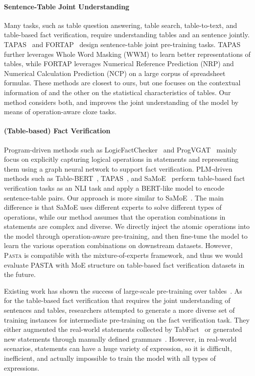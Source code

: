 \documentclass[11pt]{article}
\newcommand{\pasta}{\textsc{Pasta}\xspace}
\newcommand{\stitle}[1]{\vspace{1mm}\noindent{\bf #1}}
\newcommand{\term}[1]{\xspace}
\begin{document}
\paragraph{Sentence-Table Joint Understanding}

Many 
tasks, such as table question answering, table search, table-to-text, and table-based fact verification, require understanding tables and an \term{NL} sentence jointly.
TAPAS~\cite{tapas} and FORTAP~\cite{fortap} design sentence-table joint pre-training tasks. TAPAS further leverages Whole Word Masking (WWM) to learn better representations of tables, while FORTAP leverages Numerical Reference Prediction (NRP) and Numerical Calculation Prediction (NCP) on a large corpus of spreadsheet formulas.
These methods are closest to ours, but one focuses on the contextual information of \term{NL} and the other on the statistical characteristics of tables. Our method considers both, and improves the joint understanding of the model by means of operation-aware cloze tasks.

\paragraph{(Table-based) Fact Verification}

Program-driven methods such as LogicFactChecker~\cite{logicfactchecker} and ProgVGAT~\cite{progvgat} mainly focus on explicitly capturing logical operations in statements and representing them using a graph neural network to support fact verification. PLM-driven methods such as Table-BERT~\cite{tabfact}, TAPAS~\cite{tapasfv}, and SaMoE~\cite{SaMoE} perform table-based fact verification tasks as an NLI task and apply a BERT-like model to encode sentence-table pairs. Our approach is more similar to SaMoE~\cite{SaMoE}. 
The main difference is that SaMoE uses different experts to solve different types of operations, while our method assumes that the operation combinations in statements are complex and diverse. We directly inject the atomic operations into the model through operation-aware pre-training, and then fine-tune the model to learn the various operation combinations on downstream datasets. However, \pasta is compatible with the mixture-of-experts framework, and thus we would evaluate PASTA with MoE structure on table-based fact verification datasets in the future.


\iffalse
\stitle{Remarks.}
Existing work has shown the success of large-scale pre-training over tables~\cite{tapas,turl,tabert}. As for the table-based fact verification that requires the joint understanding of \term{NL} sentences and tables, researchers attempted to generate a more diverse set of training instances for intermediate pre-training on the fact verification task. They either augmented the real-world statements collected by TabFact~\cite{salience} or generated new statements through manually defined grammars~\cite{tapasfv}. However, in real-world scenarios, statements can have a huge variety of expression, so it is difficult, inefficient, and actually impossible to train the model with all types of expressions. 
\end{document}
